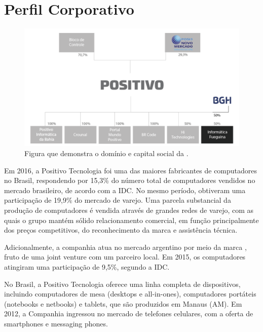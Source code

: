 \section{Perfil Corporativo}

\begin{figure}[h]
\begin{centering}
\includegraphics[width=1.0\textwidth]{Img/Corporativo}
\caption{Figura que demonstra o domínio e capital social da \nomeCompletoPositivo{}.}
\par\end{centering}
\end{figure}

Em 2016, a Positivo Tecnologia foi uma das maiores fabricantes de computadores no Brasil, respondendo por 15,3\% do número total de computadores vendidos no mercado brasileiro, de acordo com a IDC. No mesmo período, obtiveram uma participação de 19,9\% do mercado de varejo. Uma parcela substancial da produção de computadores é vendida através de grandes redes de varejo, com as quais o grupo mantém sólido relacionamento comercial, em função principalmente dos preços competitivos, do reconhecimento da marca e assistência técnica.

Adicionalmente, a companhia atua no mercado argentino por meio da marca \nomePositivoAr{}, fruto de uma joint venture com um parceiro local. Em 2015, os computadores \nomePositivoAr{} atingiram uma participação de 9,5\%, segundo a IDC.

No Brasil, a Positivo Tecnologia oferece uma linha completa de dispositivos, incluindo computadores de mesa (desktops e all-in-ones), computadores portáteis (notebooks e netbooks) e tablets, que são produzidos em Manaus (AM). Em 2012, a Companhia ingressou no mercado de telefones celulares, com a oferta de smartphones e messaging phones.

